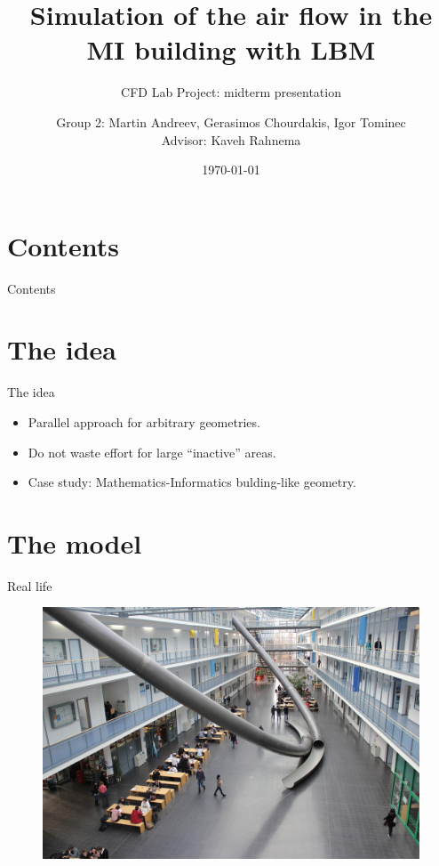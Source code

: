 \documentclass[9pt,pdftex]{beamer}
\title{Simulation of the air flow in the MI building with LBM}
\subtitle{CFD Lab Project: midterm presentation}
\author[Group 2]{Group 2: Martin Andreev, Gerasimos Chourdakis, Igor Tominec \\ Advisor: Kaveh Rahnema} %
\date{\today}
\institute{Technische Universität München}
\begin{document}
	\frame{\titlepage}

\section*{Contents}
\begin{frame}{Contents}
\tableofcontents
\end{frame}
	

\section{The idea}
\begin{frame}{The idea}
 \begin{itemize}
  \item Parallel approach for arbitrary geometries.
  \item Do not waste effort for large ``inactive'' areas.
  \item Case study: Mathematics-Informatics bulding-like geometry. 
 \end{itemize}
\end{frame}


\section{The model}

\begin{frame}{Real life}
\begin{figure}
\includegraphics[width=0.8\linewidth]{MI_slides}
\end{figure}
\end{frame}
\end{document}
